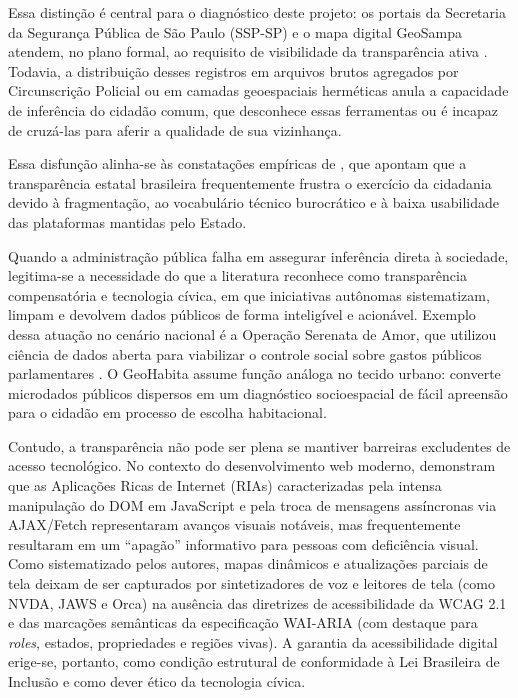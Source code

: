 \documentclass[
    12pt,
    oneside,            %
    a4paper,
    brazilian
    ]{abntex2}
\begin{document}
Essa distinção é central para o diagnóstico deste projeto: os portais da Secretaria da Segurança Pública de São Paulo (SSP-SP) e o mapa digital GeoSampa atendem, no plano formal, ao requisito de visibilidade da transparência ativa \cite{ssp2024,geosampa2024}. Todavia, a distribuição desses registros em arquivos brutos agregados por Circunscrição Policial ou em camadas geoespaciais herméticas anula a capacidade de inferência do cidadão comum, que desconhece essas ferramentas ou é incapaz de cruzá-las para aferir a qualidade de sua vizinhança.

Essa disfunção alinha-se às constatações empíricas de , que apontam que a transparência estatal brasileira frequentemente frustra o exercício da cidadania devido à fragmentação, ao vocabulário técnico burocrático e à baixa usabilidade das plataformas mantidas pelo Estado.

Quando a administração pública falha em assegurar inferência direta à sociedade, legitima-se a necessidade do que a literatura reconhece como transparência compensatória e tecnologia cívica, em que iniciativas autônomas sistematizam, limpam e devolvem dados públicos de forma inteligível e acionável. Exemplo dessa atuação no cenário nacional é a Operação Serenata de Amor, que utilizou ciência de dados aberta para viabilizar o controle social sobre gastos públicos parlamentares \cite{dalpozzo2020}. O GeoHabita assume função análoga no tecido urbano: converte microdados públicos dispersos em um diagnóstico socioespacial de fácil apreensão para o cidadão em processo de escolha habitacional.

Contudo, a transparência não pode ser plena se mantiver barreiras excludentes de acesso tecnológico. No contexto do desenvolvimento web moderno,  demonstram que as Aplicações Ricas de Internet (RIAs) caracterizadas pela intensa manipulação do DOM em JavaScript e pela troca de mensagens assíncronas via AJAX/Fetch representaram avanços visuais notáveis, mas frequentemente resultaram em um ``apagão'' informativo para pessoas com deficiência visual. Como sistematizado pelos autores, mapas dinâmicos e atualizações parciais de tela deixam de ser capturados por sintetizadores de voz e leitores de tela (como NVDA, JAWS e Orca) na ausência das diretrizes de acessibilidade da WCAG 2.1 e das marcações semânticas da especificação WAI-ARIA (com destaque para \emph{roles}, estados, propriedades e regiões vivas). A garantia da acessibilidade digital erige-se, portanto, como condição estrutural de conformidade à Lei Brasileira de Inclusão e como dever ético da tecnologia cívica.
\end{document}
